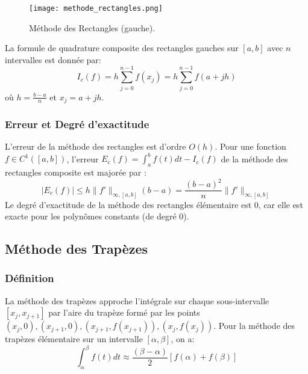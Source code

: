 \documentclass{article}
\begin{document}
\begin{figure}[h]
    \centering
    \texttt{[image: methode\_rectangles.png]}
    \caption{Méthode des Rectangles (gauche).}
    \label{fig:methode_rectangles}
\end{figure}

La formule de quadrature composite des rectangles gauches sur $[a, b]$ avec $n$ intervalles est donnée par:
\[ I_c(f) = h \sum_{j=0}^{n-1} f(x_j) = h \sum_{j=0}^{n-1} f(a + jh) \]
où $h = \frac{b-a}{n}$ et $x_j = a + jh$.

\subsubsection{Erreur et Degré d'exactitude}

L'erreur de la méthode des rectangles est d'ordre $O(h)$. Pour une fonction $f \in C^1([a, b])$, l'erreur $E_c(f) = \int_{a}^{b} f(t) dt - I_c(f)$ de la méthode des rectangles composite est majorée par :
\[ |E_c(f)| \leq h \|f'\|_{\infty,[a,b]} (b-a) = \frac{(b-a)^2}{n} \|f'\|_{\infty,[a,b]} \]
Le degré d'exactitude de la méthode des rectangles élémentaire est 0, car elle est exacte pour les polynômes constants (de degré 0).

\subsection{Méthode des Trapèzes}

\subsubsection{Définition}

La méthode des trapèzes approche l'intégrale sur chaque sous-intervalle $[x_j, x_{j+1}]$ par l'aire du trapèze formé par les points $(x_j, 0), (x_{j+1}, 0), (x_{j+1}, f(x_{j+1})), (x_j, f(x_j))$. Pour la méthode des trapèzes élémentaire sur un intervalle $[\alpha, \beta]$, on a:
\[ \int_{\alpha}^{\beta} f(t) dt \approx \frac{(\beta - \alpha)}{2} [f(\alpha) + f(\beta)] \]
\end{document}
